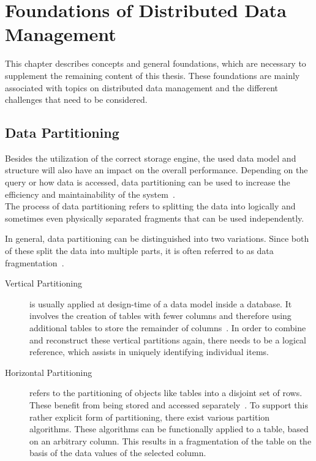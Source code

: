 \chapter{Foundations of Distributed Data Management}
\label{c:Foundation}

This chapter describes concepts and general foundations, which are necessary to supplement 
the remaining content of this thesis. These foundations are mainly associated with topics on distributed data management
and the different challenges that need to be considered.




\section{Data Partitioning}
\label{sec:part}

Besides the utilization of the correct storage engine, the used data model and structure 
will also have an impact on the overall performance. Depending on the query or 
how data is accessed, data partitioning can be used to increase the efficiency and 
maintainability of the system~\cite{Agrawal_2004}.\\
The process of data partitioning refers to splitting the data into logically and sometimes even
physically separated fragments that can be used independently.

In general, data partitioning can be distinguished into two variations.
Since both of these split the data into multiple parts, it is often referred to as data fragmentation~\cite{tamer:2005}. 

\begin{description}
    \item [Vertical Partitioning] is usually applied at design-time of a data model inside a 
    database. It involves the creation of tables with fewer columns and therefore using additional 
    tables to store the remainder of columns~\cite{vertical_1984, normalization_2012}.
    In order to combine and reconstruct these vertical partitions again, there needs to be a logical reference,
    which assists in uniquely identifying individual items. 
    \item [Horizontal Partitioning] refers to the partitioning of objects like tables 
    into a disjoint set of rows. These benefit from being stored and accessed separately~\cite{horizontal_1982}.
    To support this rather explicit form of partitioning, there exist various partition algorithms.
    These algorithms can be functionally applied to a table, based on an arbitrary column. 
    This results in a fragmentation of the table on the basis of the data values of the selected column.
\end{description}

